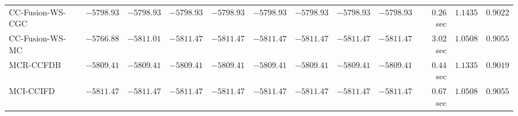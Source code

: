 \begin{table}[H]
\begin{tabular}{lrrrrrrrrrrr}
    CC-Fusion-WS-CGC & $     -5798.93$ & $     -5798.93$ & $     -5798.93$ & $     -5798.93$ & $     -5798.93$ & $     -5798.93$ & $     -5798.93$ & $     -5798.93$ & $         0.26$ sec    & $       1.1435$  & $       0.9022$ \\ 
     CC-Fusion-WS-MC & $     -5766.88$ & $     -5811.01$ & $     -5811.47$ & $     -5811.47$ & $     -5811.47$ & $     -5811.47$ & $     -5811.47$ & $     -5811.47$ & $         3.02$ sec    & $       1.0508$  & $       0.9055$ \\ 
\cmidrule{1-1} 
           MCR-CCFDB & $     -5809.41$ & $     -5809.41$ & $     -5809.41$ & $     -5809.41$ & $     -5809.41$ & $     -5809.41$ & $     -5809.41$ & $     -5809.41$ & $         0.44$ sec    & $       1.1335$  & $       0.9019$ \\ 
\cmidrule{1-1} 
           MCI-CCIFD & $     -5811.47$ & $     -5811.47$ & $     -5811.47$ & $     -5811.47$ & $     -5811.47$ & $     -5811.47$ & $     -5811.47$ & $     -5811.47$ & $         0.67$ sec    & $       1.0508$  & $       0.9055$ \\ 
\bottomrule
\end{tabular}
\end{table}

